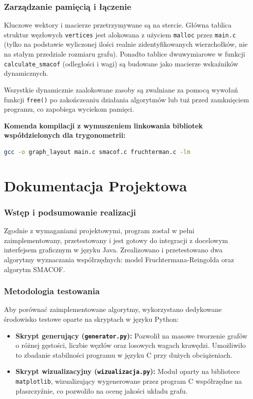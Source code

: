 \documentclass[12pt,a4paper]{article}
\begin{document}
\section{Zarządzanie pamięcią i łączenie}
Kluczowe wektory i macierze przetrzymywane są na stercie. Główna tablica struktur węzłowych \texttt{vertices} jest alokowana z użyciem \texttt{malloc} przez \texttt{main.c} (tylko na podstawie wyliczonej ilości realnie zidentyfikowanych wierzchołków, nie na stałym przedziale rozmiaru grafu). Ponadto tablice dwuwymiarowe w funkcji \texttt{calculate\_smacof} (odległości i wagi) są budowane jako macierze wskaźników dynamicznych.

Wszystkie dynamicznie zaalokowane zasoby są zwalniane za pomocą wywołań funkcji \texttt{free()} po zakończeaniu działania algorytmów lub tuż przed zamknięciem programu, co zapobiega wyciekom pamięci.

\textbf{Komenda kompilacji z wymuszeniem linkowania bibliotek współdzielonych dla trygonometrii:}
\begin{lstlisting}[language=bash]
gcc -o graph_layout main.c smacof.c fruchterman.c -lm
\end{lstlisting}

\newpage
\part{Dokumentacja Projektowa}

\section{Wstęp i podsumowanie realizacji}
Zgodnie z wymaganiami projektowymi, program został w pełni zaimplementowany, przetestowany i jest gotowy do integracji z docelowym interfejsem graficznym w języku Java. Zrealizowano i przetestowano dwa algorytmy wyznaczania współrzędnych: model Fruchtermana-Reingolda oraz algorytm SMACOF.

\section{Metodologia testowania}
Aby porównać zaimplementowane algorytmy, wykorzystano dedykowane środowisko testowe oparte na skryptach w języku Python:
\begin{itemize}
    \item \textbf{Skrypt generujący (\texttt{generator.py}):} Pozwolił na masowe tworzenie grafów o różnej gęstości, liczbie węzłów oraz losowych wagach krawędzi. Umożliwiło to zbadanie stabilności programu w języku C przy dużych obciążeniach.
    \item \textbf{Skrypt wizualizacyjny (\texttt{wizualizacja.py}):} Moduł oparty na bibliotece \texttt{matplotlib}, wizualizujący wygenerowane przez program C współrzędne na płaszczyźnie, co pozwoliło na ocenę jakości układu grafu.
\end{itemize}
\end{document}
